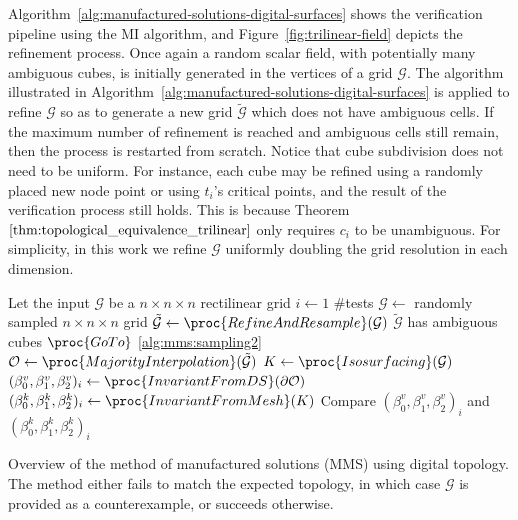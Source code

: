 Algorithm~\ref{alg:manufactured-solutions-digital-surfaces} shows the
verification pipeline using the MI algorithm, and
Figure~\ref{fig:trilinear-field} depicts the refinement process. Once
again a random scalar field, with potentially many ambiguous cubes, is
initially generated in the vertices of a grid $\mathcal{G}$.  The
algorithm illustrated in
Algorithm~\ref{alg:manufactured-solutions-digital-surfaces} is applied to
refine $\mathcal{G}$ so as to generate a new grid
$\tilde{\mathcal{G}}$ which does not have ambiguous cells. If the
maximum number of refinement is reached and ambiguous cells still
remain, then the process is restarted from scratch.  Notice that cube
subdivision does not need to be uniform.  For instance, each cube may
be refined using a randomly placed new node point or using $t_i$'s
critical points, and the result of the verification process still
holds.  This is because Theorem
$\ref{thm:topological_equivalence_trilinear}$ only requires $c_i$ to
be unambiguous.
For simplicity, in this work we refine $\mathcal{G}$ uniformly
doubling the grid resolution in each dimension.

\begin{algorithm}[t]
\begin{codebox}
\li \Comment Let the input $\mathcal{G}$ be a $n \times n \times n$ rectilinear grid
\li \For $i \gets 1$ \To $\#$tests
\li     \Do  $\mathcal{G} \gets$ randomly sampled $n \times n \times n$ grid \label{alg:mms:sampling2}
\li         $\tilde{\mathcal{G}} \gets \proc{RefineAndResample}(\mathcal{G})$
\li         \If $\tilde{\mathcal{G}}$ has ambiguous cubes
\li         	\Then $\proc{GoTo}$ \ref{alg:mms:sampling2} \label{alg:mms:goto-dt}
			\End
\li         $\mathcal{O} \gets
\proc{MajorityInterpolation}(\tilde{\mathcal{G}})$
\li 		  $K \gets \proc{Isosurfacing}(\mathcal{G})$
\li         	  $(\beta_0^v, \beta_1^v,\beta_2^v)_i \gets
\proc{InvariantFromDS}(\partial {\mathcal{O}})$
\li         	  $(\beta_0^k, \beta_1^k,\beta_2^k)_i \gets
\proc{InvariantFromMesh}(K)$
\li Compare $(\beta_0^v, \beta_1^v,\beta_2^v)_i$ and $(\beta_0^k, \beta_1^k,\beta_2^k)_i$
	    \End
      \End
\end{codebox}
\caption{Overview of the method of manufactured solutions (MMS) using digital
topology. The method either fails to match the expected topology, in
which case $\mathcal{G}$  is provided as a counterexample, or
succeeds otherwise.}
\label{alg:manufactured-solutions-digital-surfaces}
\end{algorithm}

